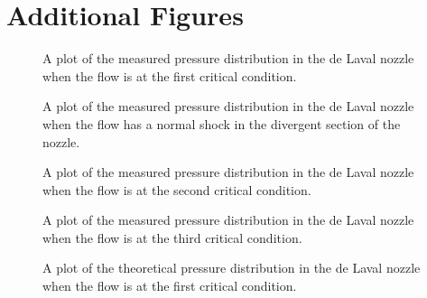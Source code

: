 \newpage

\section{Additional Figures} \label{sec:additional_figures}

\begin{figure}[htpb]
    \centering
    
    \caption{A plot of the measured pressure distribution in the de Laval nozzle when the flow is at the first critical condition.}
    \label{fig:measured_pressure_1st_critical}
\end{figure}

\begin{figure}[htpb]
    \centering
    
    \caption{A plot of the measured pressure distribution in the de Laval nozzle when the flow has a normal shock in the divergent section of the nozzle.}
    \label{fig:measured_pressure_normal_shock}
\end{figure}

\begin{figure}[htpb]
    \centering
    
    \caption{A plot of the measured pressure distribution in the de Laval nozzle when the flow is at the second critical condition.}
    \label{fig:measured_pressure_2nd_critical}
\end{figure}

\begin{figure}[htpb]
    \centering
    
    \caption{A plot of the measured pressure distribution in the de Laval nozzle when the flow is at the third critical condition.}
    \label{fig:measured_pressure_3rd_critical}
\end{figure}

\begin{figure}[htpb]
    \centering
    
    \caption{A plot of the theoretical pressure distribution in the de Laval nozzle when the flow is at the first critical condition.}
    \label{fig:theoretical_pressure_1st_critical}
\end{figure}

